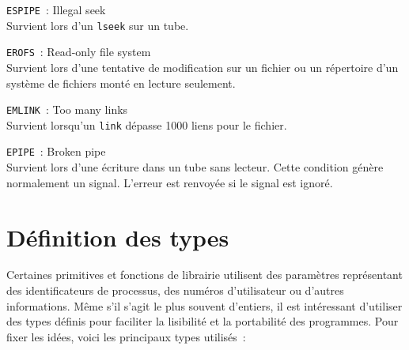 \documentclass [twoside] {report}
\begin{document}
{\tt ESPIPE}~: Illegal seek \\
Survient lors d'un {\tt lseek} sur un tube.

{\tt EROFS}~: Read-only file system \\
Survient lors d'une tentative de modification sur
un fichier ou un répertoire d'un système de
fichiers monté en lecture seulement.

{\tt EMLINK}~: Too many links \\
Survient lorsqu'un {\tt link} dépasse 1000 liens
pour le fichier.

{\tt EPIPE}~: Broken pipe \\
Survient lors d'une écriture dans un tube sans
lecteur. Cette condition génère normalement un
signal. L'erreur est renvoyée si le signal est
ignoré.




\section {Définition des types}

Certaines primitives et fonctions de librairie utilisent des paramètres
représentant des identificateurs de processus, des numéros d'utilisateur
ou d'autres informations.  Même s'il s'agit le plus souvent d'entiers,
il est intéressant d'utiliser des types définis pour faciliter la
lisibilité et la portabilité des programmes. Pour fixer les idées, voici
les principaux types utilisés~:
\end{document}
